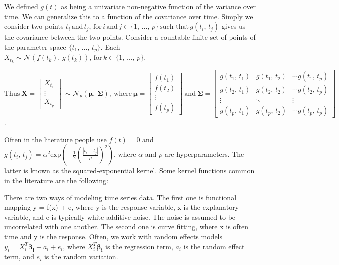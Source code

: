 \documentclass[a4paper, 10pt]{article}
\begin{document}
\begin{flushleft}
   We defined $g(t)$ as being a univariate non-negative function of the variance over time. We can generalize this to a function of the covariance over time. Simply we consider two points $t_{i} \, \text{and} \, t_{j}, \, \text{for} \, i \, \text{and} \, j \in \{1, \, \ldots, \, p\} \, \text{such that} \, g(t_{i}, \, t_{j})$ gives us the covariance between the two points. Consider a countable finite set of points of the parameter space $\{t_{1}, \, \ldots, \, t_{p}\}$. Each $X_{t_{k}} \sim \mathcal{N}(f(t_{k}), \, g(t_{k})), \, \text{for} \, k \in \{1,\, \ldots,\, p\}$.

   $
   \text{Thus}
   \:
   \mathbf{X} =
   \begin{bmatrix}
      X_{t_{1}} \\
      \vdots \\
      X_{t_{p}}
   \end{bmatrix}
   \:
   \sim \mathcal{N}_{p}(\boldsymbol{\mu}, \, \boldsymbol{\Sigma}),
   \:
   \text{where}
   \:
   \boldsymbol{\mu} = 
   \begin{bmatrix}
      f(t_{1}) \\
      f(t_{2}) \\
      \vdots \\
      f(t_{p})
   \end{bmatrix}  
   \: 
   \text{and}
   \:
   \boldsymbol{\Sigma} = 
   \begin{bmatrix}
      g(t_{1}, \, t_{1}) & g(t_{1}, \, t_{2}) & \cdots g(t_{1}, \, t_{p}) \\
      g(t_{2}, \, t_{1}) & g(t_{2}, \, t_{2}) & \cdots g(t_{2}, \, t_{p}) \\
      \vdots & \ddots & \vdots \\
      g(t_{p}, \, t_{1}) & g(t_{p}, \, t_{2}) & \cdots g(t_{p}, \, t_{p})
   \end{bmatrix}$.

   \vspace{1em}
   
   Often in the literature people use $f(t) = 0$ and $g(t_{i}, \, t_{j}) = \alpha^{2} \text{exp}(- \frac{1}{2} (\frac{|t_i - t_j|}{\rho})^2)$, where $\alpha$ and $\rho$ are hyperparameters. The latter is known as the squared-exponential kernel. Some kernel functions common in the literature are the following:

   \vspace{1em}
   
   There are two ways of modeling time series data. The first one is functional mapping y = f(x) + e, where y is the response variable, x is the explanatory variable, and e is typically white additive noise. The noise is assumed to be uncorrelated with one another. The second one is curve fitting, where x is often time and y is the response. Often, we work with random effects models $y_{i} = X_{i}^{T} \boldsymbol{\beta_{i}} + a_{i} + e_{i}$, where $X_{i}^{T} \boldsymbol{\beta_{i}}$ is the regression term, $a_{i}$ is the random effect term, and $e_{i}$ is the random variation.


\end{flushleft}
\end{document}
